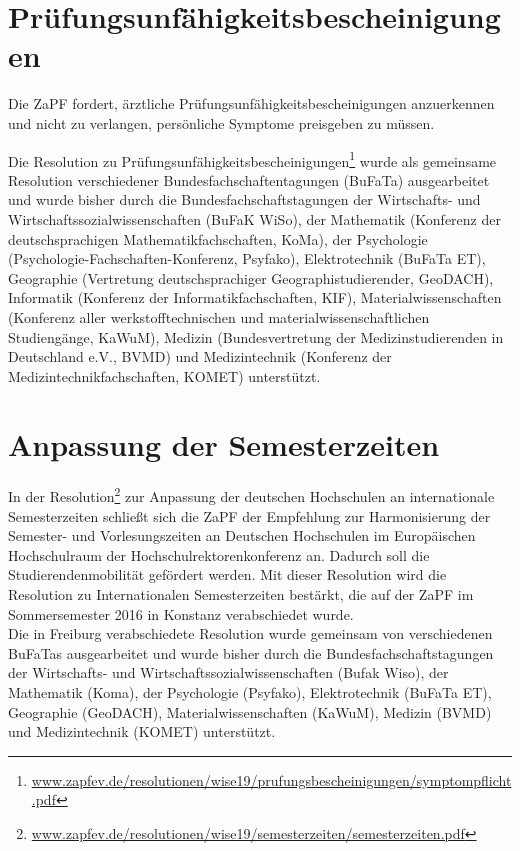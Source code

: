 \section*{Prüfungsunfähigkeitsbescheinigungen} 
Die ZaPF fordert, ärztliche Prüfungsunfähigkeitsbescheinigungen anzuerkennen und nicht zu verlangen, persönliche Symptome preisgeben zu  müssen.

Die Resolution zu Prüfungsunfähigkeitsbescheinigungen\footnote{\url{www.zapfev.de/resolutionen/wise19/prufungsbescheinigungen/symptompflicht.pdf}} wurde als gemeinsame Resolution verschiedener Bundesfachschaftentagungen (BuFaTa) ausgearbeitet und wurde bisher durch die  Bundesfachschaftstagungen der Wirtschafts- und   Wirtschaftssozialwissenschaften  (BuFaK WiSo), der Mathematik (Konferenz der deutschsprachigen Mathematikfachschaften, KoMa),  der Psychologie  (Psychologie-Fachschaften-Konferenz, Psyfako), Elektrotechnik (BuFaTa ET), Geographie (Vertretung deutschsprachiger Geographistudierender, GeoDACH), Informatik (Konferenz der Informatikfachschaften, KIF), Materialwissenschaften (Konferenz aller werkstofftechnischen und materialwissenschaftlichen Studiengänge, KaWuM), Medizin (Bundesvertretung der Medizinstudierenden in Deutschland e.V., BVMD) und Medizintechnik (Konferenz der Medizintechnikfachschaften, KOMET) unterstützt.

\section*{Anpassung der Semesterzeiten}
In der Resolution\footnote{\url{www.zapfev.de/resolutionen/wise19/semesterzeiten/semesterzeiten.pdf}} zur Anpassung der deutschen Hochschulen an internationale Semesterzeiten schließt sich die ZaPF der \glqq Empfehlung zur Harmonisierung der Semester- und Vorlesungszeiten an Deutschen Hochschulen im Europäischen Hochschulraum\grqq{} der Hochschulrektorenkonferenz an. Dadurch soll die Studierendenmobilität gefördert werden.
Mit dieser Resolution wird die Resolution zu Internationalen Semesterzeiten bestärkt, die auf der ZaPF im Sommersemester 2016 in Konstanz verabschiedet wurde.\\
Die in Freiburg verabschiedete Resolution wurde gemeinsam von verschiedenen BuFaTas ausgearbeitet und wurde bisher durch die  Bundesfachschaftstagungen der Wirtschafts- und  Wirtschaftssozialwissenschaften  (Bufak Wiso), der Mathematik (Koma), der Psychologie  (Psyfako), Elektrotechnik (BuFaTa ET), Geographie (GeoDACH), Materialwissenschaften (KaWuM), Medizin (BVMD) und Medizintechnik (KOMET) unterstützt.

